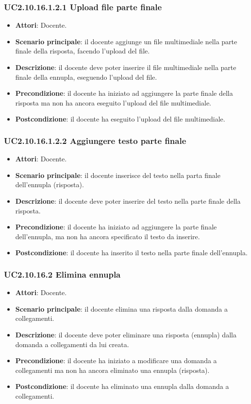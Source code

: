 \subsubsection{UC2.10.16.1.2.1 Upload file parte finale}
\begin{itemize}
\item \textbf{Attori}: Docente.
\item \textbf{Scenario principale}: il docente aggiunge un file multimediale nella parte finale della risposta, facendo l'upload del file.
\item \textbf{Descrizione}: il docente deve poter inserire il file multimediale nella parte finale della ennupla, eseguendo l'upload del file.
\item \textbf{Precondizione}: il docente ha iniziato ad aggiungere la parte finale della risposta ma non ha ancora eseguito l'upload del file multimediale.
\item \textbf{Postcondizione}: il docente ha eseguito l'upload del file multimediale.
\end{itemize}
\subsubsection{UC2.10.16.1.2.2 Aggiungere testo parte finale}
\begin{itemize}
\item \textbf{Attori}: Docente.
\item \textbf{Scenario principale}: il docente inserisce del testo nella parta finale dell'ennupla (risposta).
\item \textbf{Descrizione}: il docente deve poter inserire del testo nella parte finale della risposta.
\item \textbf{Precondizione}: il docente ha iniziato ad aggiungere la parte finale dell'ennupla, ma non ha ancora specificato il testo da inserire.
\item \textbf{Postcondizione}: il docente ha inserito il testo nella parte finale dell'ennupla.
\end{itemize}
\subsubsection{UC2.10.16.2 Elimina ennupla}
\begin{itemize}
\item \textbf{Attori}: Docente.
\item \textbf{Scenario principale}: il docente elimina una risposta dalla domanda a collegamenti.
\item \textbf{Descrizione}: il docente deve poter eliminare una risposta (ennupla) dalla domanda a collegamenti da lui creata.
\item \textbf{Precondizione}: il docente ha iniziato a modificare una domanda a collegamenti ma non ha ancora eliminato una ennupla (risposta).
\item \textbf{Postcondizione}: il docente ha eliminato una ennupla dalla domanda a collegamenti.
\end{itemize}
